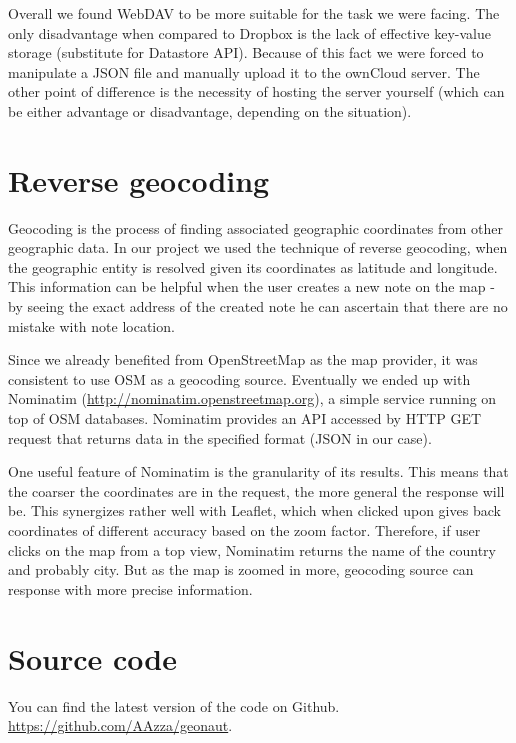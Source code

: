 \documentclass[12pt,a4paper]{article}
\begin{document}
Overall we found WebDAV to be more suitable for the task we were
facing. The only disadvantage when compared to Dropbox is the lack of
effective key-value storage (substitute for Datastore API). Because of
this fact we were forced to manipulate a JSON file and manually upload
it to the ownCloud server. The other point of difference is the
necessity of hosting the server yourself (which can be either
advantage or disadvantage, depending on the situation).

\section{Reverse geocoding}

Geocoding is the process of finding associated geographic coordinates
from other geographic data. In our project we used the technique of
reverse geocoding, when the geographic entity is resolved given its
coordinates as latitude and longitude. This information can be helpful
when the user creates a new note on the map - by seeing the exact
address of the created note he can ascertain that there are no mistake
with note location.

Since we already benefited from OpenStreetMap as the map provider, it was
consistent to use OSM as a geocoding source. Eventually we ended up
with Nominatim (\url{http://nominatim.openstreetmap.org}), a simple
service running on top of OSM databases. Nominatim provides an API
accessed by HTTP GET request that returns data in the specified format
(JSON in our case).

One useful feature of Nominatim is the granularity of its results.
This means that the coarser the coordinates are in the request, the
more general the response will be. This synergizes rather well with
Leaflet, which when clicked upon gives back coordinates of different
accuracy based on the zoom factor. Therefore, if user clicks on the
map from a top view, Nominatim returns the name of the country and
probably city. But as the map is zoomed in more, geocoding source can
response with more precise information.

\section{Source code}
    You can find the latest version of the code on Github.
    \url{https://github.com/AAzza/geonaut}.
\end{document}
